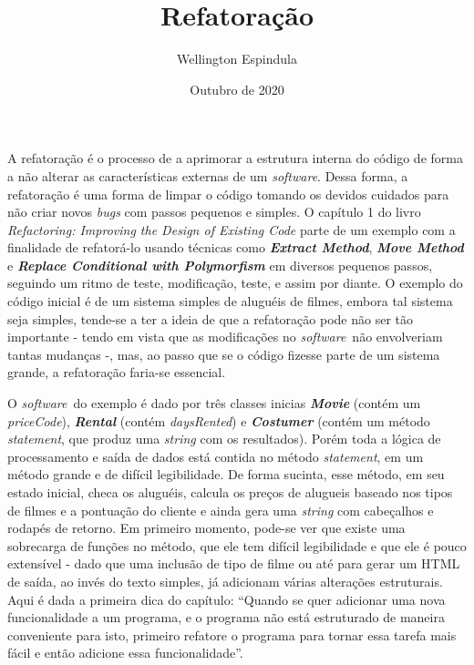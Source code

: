 \documentclass[12pt, a4paper]{article}
\title{Refatoração}
\author{Wellington Espindula}
\date{Outubro de 2020}
\newcommand{\tit}[1]{\textit{#1}}
\newcommand{\tbi}[1]{\textbf{\textit{#1}}}
\newcommand{\sw}{\tit{software}}
\newcommand{\quotes}[1]{``#1''}
\begin{document}
    \maketitle
   
    A refatoração é o processo de a aprimorar a estrutura interna do código de forma a não alterar as características externas de um \sw. Dessa forma, a refatoração é uma forma de limpar o código tomando os devidos cuidados para não criar novos \tit{bugs} com passos pequenos e simples.
    O capítulo 1 do livro \tit{Refactoring: Improving the Design of Existing Code} parte de um exemplo com a finalidade de refatorá-lo usando técnicas como \tbi{Extract Method}, \tbi{Move Method} e \tbi{Replace Conditional with Polymorfism} em diversos pequenos passos, seguindo um ritmo de teste, modificação, teste, e assim por diante. O exemplo do código inicial é de um sistema simples de aluguéis de filmes, embora tal sistema seja simples, tende-se a ter a ideia de que a refatoração pode não ser tão importante - tendo em vista que as modificações no \sw \ não envolveriam tantas mudanças -, mas, ao passo que se o código fizesse parte de um sistema grande, a refatoração faria-se essencial. 
    
    O \sw \ do exemplo é dado por três classes inicias \tbi{Movie} (contém um \tit{priceCode}), \tbi{Rental} (contém \tit{daysRented}) e \tbi{Costumer} (contém um método \tit{statement}, que produz uma \tit{string} com os resultados). Porém toda a lógica de processamento e saída de dados está contida no método \tit{statement}, em um método grande e de difícil legibilidade. De forma sucinta, esse método, em seu estado inicial, checa os aluguéis, calcula os preços de alugueis baseado nos tipos de filmes e a pontuação do cliente e ainda gera uma \tit{string} com cabeçalhos e rodapés de retorno. Em primeiro momento, pode-se ver que existe uma sobrecarga de funções no método, que ele tem difícil legibilidade e que ele é pouco extensível - dado que uma inclusão de tipo de filme ou até para gerar um HTML de saída, ao invés do texto simples, já adicionam várias alterações estruturais. Aqui é dada a primeira dica do capítulo: \quotes{Quando se quer adicionar uma nova funcionalidade a um programa, e o programa não está estruturado de maneira conveniente para isto, primeiro refatore o programa para tornar essa tarefa mais fácil e então adicione essa funcionalidade}.
    
\end{document}
